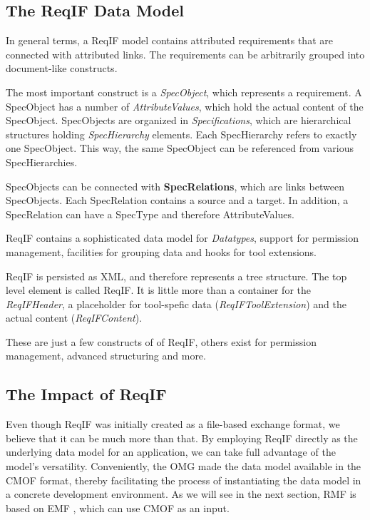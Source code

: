 \documentclass{template/openetcs_report}
\begin{document}
\subsection{The ReqIF Data Model}

In general terms, a ReqIF model contains attributed requirements that are connected with attributed links.  The requirements can be arbitrarily grouped into document-like constructs.

The most important construct is a {\em SpecObject}, which represents a requirement. A SpecObject has a number of {\em AttributeValues}, which hold the actual content of the SpecObject. SpecObjects are organized in {\em Specifications}, which are hierarchical structures holding {\em SpecHierarchy} elements. Each SpecHierarchy refers to exactly one SpecObject. This way, the same SpecObject can be referenced from various SpecHierarchies.

SpecObjects can be connected with \textbf{SpecRelations}, which are links between SpecObjects. Each SpecRelation contains a source and a target.  In addition, a SpecRelation can have a SpecType and therefore AttributeValues.

ReqIF contains a sophisticated data model for {\em Datatypes}, support for permission management, facilities for grouping data and hooks for tool extensions.

ReqIF is persisted as XML, and therefore represents a tree structure.  The top level element is called ReqIF.  It is little more than a container for the \emph{ReqIFHeader}, a placeholder for tool-spefic data (\emph{ReqIFToolExtension}) and the actual content (\emph{ReqIFContent}).

These are just a few constructs of of ReqIF, others exist for permission management, advanced structuring and more.

\subsection{The Impact of ReqIF}

Even though ReqIF was initially created as a file-based exchange format, we believe that it can be much more than that.  By employing ReqIF directly as the underlying data model for an application, we can take full advantage of the model's versatility.  Conveniently, the OMG made the data model available in the CMOF format, thereby facilitating the process of instantiating the data model in a concrete development environment.  As we will see in the next section, RMF is based on EMF \cite{emf}, which can use CMOF as an input.
\end{document}
